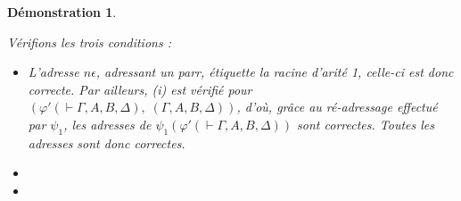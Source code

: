 \documentclass[11pt,a4paper]{article}
\newtheorem{demonstration}{Démonstration}
\newcommand*{\encode}{\ensuremath{\varphi}}
\begin{document}
\begin{demonstration}
\begin{itemize}
    Vérifions les trois conditions :
    \begin{itemize}
        \item[(i) :]{L'adresse $n \epsilon$, adressant un parr, étiquette la racine d'arité 1, celle-ci est donc correcte. Par ailleurs, (i) est vérifié pour $\left( \encode ' \left( \vdash \Gamma, A, B, \Delta \right), \; \left( \Gamma, A, B, \Delta \right) \right)$, d'où, grâce au ré-adressage effectué par $\psi_1$, les adresses de $\psi_1 \left( \encode' \left( \vdash \Gamma, A, B, \Delta \right) \right)$ sont correctes. Toutes les adresses sont donc correctes.
        }
        
        \item[(ii) :]
        \item[(iii) :]
    \end{itemize}

    \end{itemize}

    
\end{demonstration}
\end{document}
